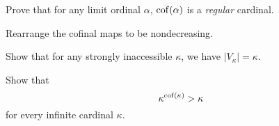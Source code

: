 \begin{problem}
	Prove that for any limit ordinal $\alpha$, $\operatorname{cof}(\alpha)$ is a \emph{regular} cardinal.
	\begin{hint}
		Rearrange the cofinal maps to be nondecreasing.
	\end{hint}
\end{problem}

\begin{sproblem}
	\label{prob:strongly_inaccessible}
	Show that for any strongly inaccessible $\kappa$,
	we have $\left\lvert V_\kappa \right\rvert = \kappa$.
\end{sproblem}

\begin{problem}
	Show that \[ \kappa^{\operatorname{cof}(\kappa)} > \kappa \] for every infinite cardinal $\kappa$.
\end{problem}
